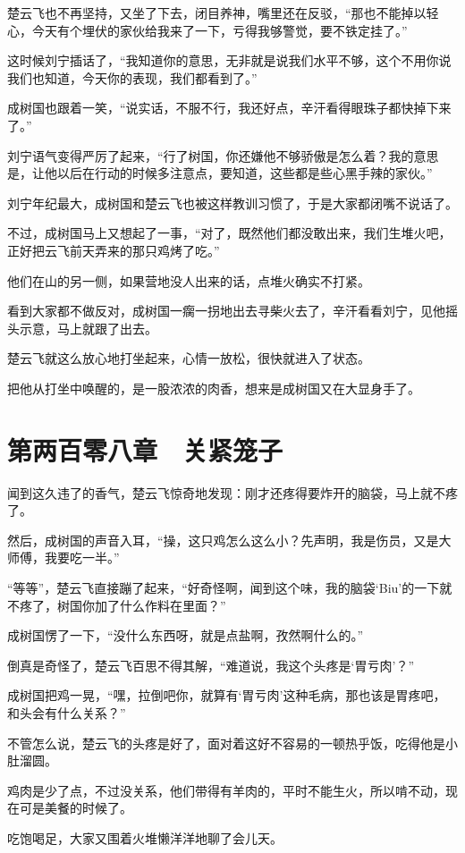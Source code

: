 楚云飞也不再坚持，又坐了下去，闭目养神，嘴里还在反驳，“那也不能掉以轻心，今天有个埋伏的家伙给我来了一下，亏得我够警觉，要不铁定挂了。”

这时候刘宁插话了，“我知道你的意思，无非就是说我们水平不够，这个不用你说我们也知道，今天你的表现，我们都看到了。”

成树国也跟着一笑，“说实话，不服不行，我还好点，辛汗看得眼珠子都快掉下来了。”

刘宁语气变得严厉了起来，“行了树国，你还嫌他不够骄傲是怎么着？我的意思是，让他以后在行动的时候多注意点，要知道，这些都是些心黑手辣的家伙。”

刘宁年纪最大，成树国和楚云飞也被这样教训习惯了，于是大家都闭嘴不说话了。

不过，成树国马上又想起了一事，“对了，既然他们都没敢出来，我们生堆火吧，正好把云飞前天弄来的那只鸡烤了吃。”

他们在山的另一侧，如果营地没人出来的话，点堆火确实不打紧。

看到大家都不做反对，成树国一瘸一拐地出去寻柴火去了，辛汗看看刘宁，见他摇头示意，马上就跟了出去。

楚云飞就这么放心地打坐起来，心情一放松，很快就进入了状态。

把他从打坐中唤醒的，是一股浓浓的肉香，想来是成树国又在大显身手了。

\section{第两百零八章　关紧笼子}

闻到这久违了的香气，楚云飞惊奇地发现：刚才还疼得要炸开的脑袋，马上就不疼了。

然后，成树国的声音入耳，“操，这只鸡怎么这么小？先声明，我是伤员，又是大师傅，我要吃一半。”

“等等”，楚云飞直接蹦了起来，“好奇怪啊，闻到这个味，我的脑袋‘Biu’的一下就不疼了，树国你加了什么作料在里面？”

成树国愣了一下，“没什么东西呀，就是点盐啊，孜然啊什么的。”

倒真是奇怪了，楚云飞百思不得其解，“难道说，我这个头疼是‘胃亏肉’？”

成树国把鸡一晃，“嘿，拉倒吧你，就算有‘胃亏肉’这种毛病，那也该是胃疼吧，和头会有什么关系？”

不管怎么说，楚云飞的头疼是好了，面对着这好不容易的一顿热乎饭，吃得他是小肚溜圆。

鸡肉是少了点，不过没关系，他们带得有羊肉的，平时不能生火，所以啃不动，现在可是美餐的时候了。

吃饱喝足，大家又围着火堆懒洋洋地聊了会儿天。

